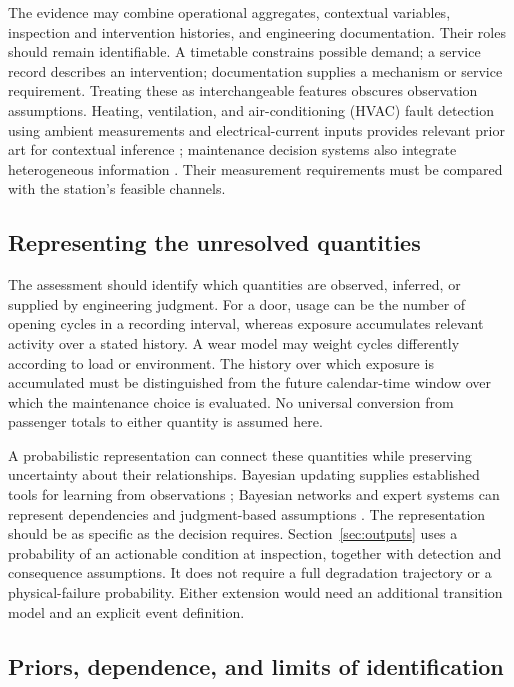 \documentclass[symmetry,article,submit,pdftex,oneauthor]{Definitions/mdpi}
\begin{document}
The evidence may combine operational aggregates, contextual variables, inspection and intervention histories, and engineering documentation. Their roles should remain identifiable. A timetable constrains possible demand; a service record describes an intervention; documentation supplies a mechanism or service requirement. Treating these as interchangeable features obscures observation assumptions. Heating, ventilation, and air-conditioning (HVAC) fault detection using ambient measurements and electrical-current inputs provides relevant prior art for contextual inference \citep{Haruehansapong2023}; maintenance decision systems also integrate heterogeneous information \citep{Ma2020}. Their measurement requirements must be compared with the station's feasible channels.

\subsection{Representing the unresolved quantities}

The assessment should identify which quantities are observed, inferred, or supplied by engineering judgment. For a door, usage can be the number of opening cycles in a recording interval, whereas exposure accumulates relevant activity over a stated history. A wear model may weight cycles differently according to load or environment. The history over which exposure is accumulated must be distinguished from the future calendar-time window over which the maintenance choice is evaluated. No universal conversion from passenger totals to either quantity is assumed here.

A probabilistic representation can connect these quantities while preserving uncertainty about their relationships. Bayesian updating supplies established tools for learning from observations \citep{Straub2015}; Bayesian networks and expert systems can represent dependencies and judgment-based assumptions \citep{Kabir2019154,Baraldi2015176}. The representation should be as specific as the decision requires. Section~\ref{sec:outputs} uses a probability of an actionable condition at inspection, together with detection and consequence assumptions. It does not require a full degradation trajectory or a physical-failure probability. Either extension would need an additional transition model and an explicit event definition.

\subsection{Priors, dependence, and limits of identification}
\end{document}
